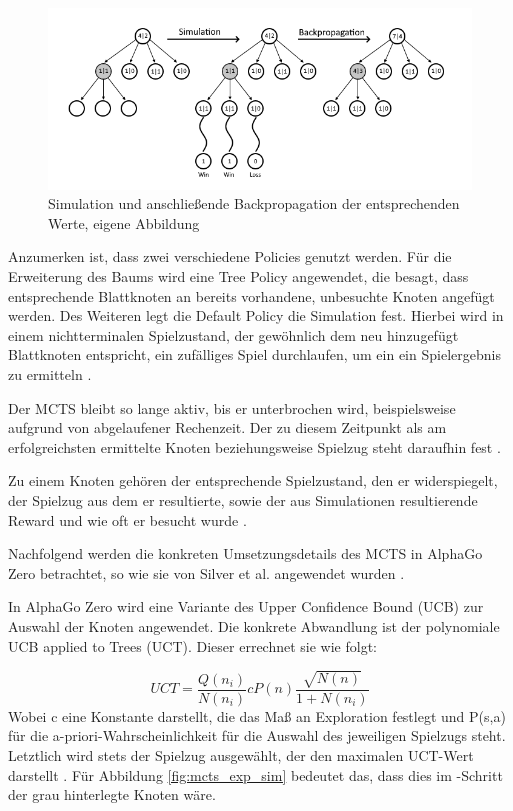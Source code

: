 \documentclass[12pt,a4paper]{article}
\begin{document}
\begin{figure}
\centering
\includegraphics[width=1.0\textwidth]{pics/Backpropagation.png}
\caption{Simulation und anschließende Backpropagation der entsprechenden Werte, eigene Abbildung}
	\label{fig:mcts_backpropagation}
\end{figure}

Anzumerken ist, dass zwei verschiedene Policies genutzt werden. Für die Erweiterung des Baums wird eine Tree Policy angewendet, die besagt, dass entsprechende Blattknoten an bereits vorhandene, unbesuchte Knoten angefügt werden. Des Weiteren legt die Default Policy die Simulation fest. Hierbei wird in einem nichtterminalen Spielzustand, der gewöhnlich dem neu hinzugefügt Blattknoten entspricht, ein zufälliges Spiel durchlaufen, um ein ein Spielergebnis zu ermitteln \cite{Browne2012}. 

Der MCTS bleibt so lange aktiv, bis er unterbrochen wird, beispielsweise aufgrund von abgelaufener Rechenzeit. Der zu diesem Zeitpunkt als am erfolgreichsten ermittelte Knoten beziehungsweise Spielzug steht daraufhin fest \cite{Browne2012}.

Zu einem Knoten gehören der entsprechende Spielzustand, den er widerspiegelt, der Spielzug aus dem er resultierte, sowie der aus Simulationen resultierende Reward und wie oft er besucht wurde \cite{Browne2012}.

Nachfolgend werden die konkreten Umsetzungsdetails des MCTS in AlphaGo Zero betrachtet, so wie sie von Silver et al. angewendet wurden \cite{Silver2017}.

In AlphaGo Zero wird eine Variante des Upper Confidence Bound (UCB) zur Auswahl der Knoten angewendet. Die konkrete Abwandlung ist der polynomiale UCB applied to Trees (UCT). Dieser errechnet sie wie folgt:

\begin{equation}
UCT = \frac{Q(n_i)}{N(n_i)} cP(n) \frac{\sqrt{N(n)}}{1+N(n_i)}
\end{equation} 
Wobei c eine Konstante darstellt, die das Maß an Exploration festlegt und P(s,a) für die a-priori-Wahrscheinlichkeit für die Auswahl des jeweiligen Spielzugs steht. Letztlich wird stets der Spielzug ausgewählt, der den maximalen UCT-Wert darstellt \cite{Silver2017}.
Für Abbildung \ref{fig:mcts_exp_sim} bedeutet das, dass dies im \grqq{}-Schritt der grau hinterlegte Knoten wäre.
\end{document}

